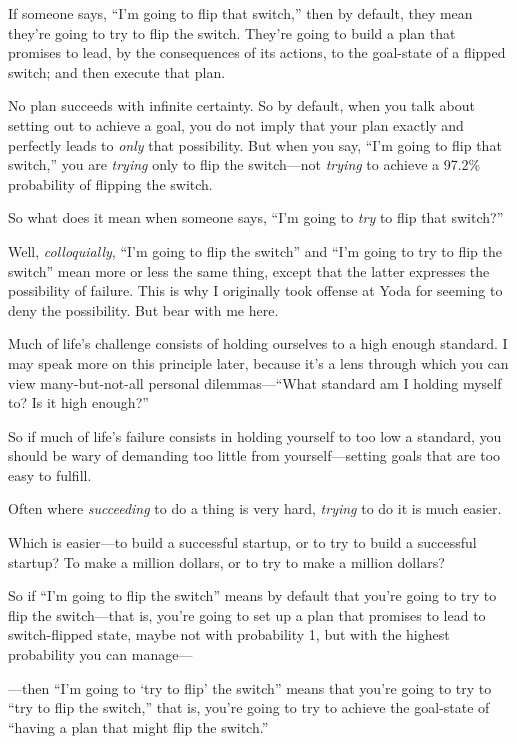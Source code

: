 {
 If someone says, ``I'm going to
flip that switch,'' then by default, they mean
they're going to try to flip the switch.
They're going to build a plan that promises to lead, by
the consequences of its actions, to the goal-state of a flipped switch;
and then execute that plan.}

{
 No plan succeeds with infinite certainty. So by default, when you
talk about setting out to achieve a goal, you do not imply that your
plan exactly and perfectly leads to \textit{only} that possibility. But
when you say, ``I'm going to flip that
switch,'' you are \textit{trying} only to flip the
switch---not \textit{trying} to achieve a 97.2\% probability of
flipping the switch.}

{
 So what does it mean when someone says,
``I'm going to \textit{try} to flip
that switch?''}

{
 Well, \textit{colloquially},
``I'm going to flip the
switch'' and ``I'm
going to try to flip the switch'' mean more or less
the same thing, except that the latter expresses the possibility of
failure. This is why I originally took offense at Yoda for seeming to
deny the possibility. But bear with me here.}

{
 Much of life's challenge consists of holding
ourselves to a high enough standard. I may speak more on this principle
later, because it's a lens through which you can view
many-but-not-all personal dilemmas---``What standard
am I holding myself to? Is it high enough?''}

{
 So if much of life's failure consists in holding
yourself to too low a standard, you should be wary of demanding too
little from yourself---setting goals that are too easy to fulfill.}

{
 Often where \textit{succeeding} to do a thing is very hard,
\textit{trying} to do it is much easier.}

{
 Which is easier---to build a successful startup, or to try to
build a successful startup? To make a million dollars, or to try to
make a million dollars?}

{
 So if ``I'm going to flip the
switch'' means by default that you're
going to try to flip the switch---that is, you're going
to set up a plan that promises to lead to switch-flipped state, maybe
not with probability 1, but with the highest probability you can
manage---}

{
 {}---then ``I'm going to
`try to flip' the
switch'' means that you're going to
try to ``try to flip the switch,''
that is, you're going to try to achieve the goal-state
of ``having a plan that might flip the
switch.''}

